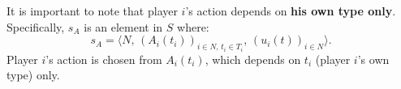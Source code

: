 \documentclass[12pt, a4paper]{article}
\begin{document}
\begin{notebox}
It is important to note that player $i$'s action depends on \textbf{his own type only}. Specifically, $s_A$ is an element in $S$ where:
\[
  s_A = \bigl\langle N,\, (A_i(t_i))_{i \in N,\, t_i \in T_i},\, (u_i(t))_{i \in N} \bigr\rangle.
\]
Player $i$'s action is chosen from $A_i(t_i)$, which depends on $t_i$ (player $i$'s own type) only.
\end{notebox}
\end{document}
